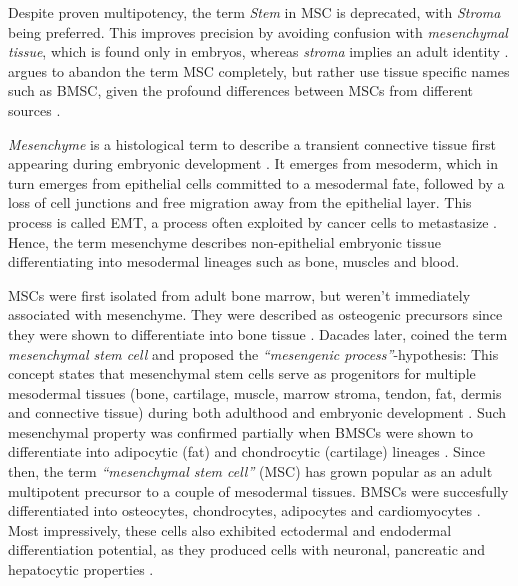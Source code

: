 Despite proven multipotency, the term \emph{Stem} in \ac{MSC} is deprecated,
with \emph{Stroma} being preferred. This improves precision by avoiding
confusion with \emph{mesenchymal tissue}, which is found only in embryos,
whereas \emph{stroma} implies an adult identity
\cite{robeyMesenchymalStemCells2017}. \citet{robeyMesenchymalStemCells2017}
argues to abandon the term MSC completely, but rather use tissue specific names
such as \ac{BMSC}, given the profound differences between MSCs from different
sources \cite{jansenFunctionalDifferencesMesenchymal2010,
    sacchettiNoIdenticalMesenchymal2016}.


\emph{Mesenchyme} is a histological term to describe a transient connective
tissue first appearing during embryonic development
\cite{robeyMesenchymalStemCells2017}. It emerges from mesoderm, which in turn
emerges from epithelial cells committed to a mesodermal fate, followed by a loss
of cell junctions and free migration away from the epithelial layer. This
process is called \acf{EMT}, a process often exploited by cancer cells to
metastasize \cite{tamFormationMesodermalTissues1987,
    nowotschinCellularDynamicsEarly2010}. Hence, the term mesenchyme describes
non-epithelial embryonic tissue differentiating into mesodermal lineages such as
bone, muscles and blood.

\acp{MSC} were first isolated from adult bone marrow, but weren't immediately
associated with mesenchyme. They were described as osteogenic precursors since
they were shown to differentiate into bone tissue
\cite{friedensteinOsteogenesisTransplantsBone1966,
    friedensteinOsteogenicPrecursorCells1971, biancoMesenchymalStemCells2014}.
Dacades later, \citet{caplanMesenchymalStemCells1991} coined the term
\emph{mesenchymal stem cell} and proposed the \emph{``mesengenic
    process''}-hypothesis: This concept states that mesenchymal stem cells serve as
progenitors for multiple mesodermal tissues (bone, cartilage, muscle, marrow
stroma, tendon, fat, dermis and connective tissue) during both adulthood and
embryonic development \cite{caplanMesengenicProcess1994}. Such mesenchymal
property was confirmed partially when \acp{BMSC} were shown to differentiate
into adipocytic (fat) and chondrocytic (cartilage) lineages
\cite{pittengerMultilineagePotentialAdult1999}. Since then, the term
\emph{``mesenchymal stem cell''} (MSC) has grown popular as an adult multipotent
precursor to a couple of mesodermal tissues. \acp{BMSC} were succesfully
differentiated into osteocytes, chondrocytes, adipocytes and cardiomyocytes
\cite{gronthosSTRO1FractionAdult1994,
    muruganandanAdipocyteDifferentiationBone2009, xuMesenchymalStemCells2004}. Most
impressively, these cells also exhibited ectodermal and endodermal
differentiation potential, as they produced cells with neuronal, pancreatic and
hepatocytic properties \cite{barzilayLentiviralDeliveryLMX1a2009,
    wilkinsHumanBoneMarrowderived2009, gabrInsulinproducingCellsAdult2013,
    stockHumanBoneMarrow2014}.

